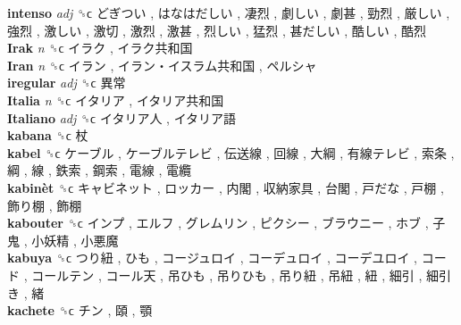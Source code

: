 \textbf{intenso} \emph{adj}  ␝ϲ   どぎつい ,  はなはだしい ,  凄烈 ,  劇しい ,  劇甚 ,  勁烈 ,  厳しい ,  強烈 ,  激しい ,  激切 ,  激烈 ,  激甚 ,  烈しい ,  猛烈 ,  甚だしい ,  酷しい ,  酷烈   \\
\textbf{Irak} \emph{n}  ␝ϲ   イラク ,  イラク共和国   \\
\textbf{Iran} \emph{n}  ␝ϲ   イラン ,  イラン・イスラム共和国 ,  ペルシャ   \\
\textbf{iregular} \emph{adj}  ␝ϲ   異常   \\
\textbf{Italia} \emph{n}  ␝ϲ   イタリア ,  イタリア共和国   \\
\textbf{Italiano} \emph{adj}  ␝ϲ   イタリア人 ,  イタリア語   \\
\textbf{kabana} ␝ϲ   杖   \\
\textbf{kabel} ␝ϲ   ケーブル ,  ケーブルテレビ ,  伝送線 ,  回線 ,  大綱 ,  有線テレビ ,  索条 ,  綱 ,  線 ,  鉄索 ,  鋼索 ,  電線 ,  電纜   \\
\textbf{kabinèt} ␝ϲ   キャビネット ,  ロッカー ,  内閣 ,  収納家具 ,  台閣 ,  戸だな ,  戸棚 ,  飾り棚 ,  飾棚   \\
\textbf{kabouter} ␝ϲ   インプ ,  エルフ ,  グレムリン ,  ピクシー ,  ブラウニー ,  ホブ ,  子鬼 ,  小妖精 ,  小悪魔   \\
\textbf{kabuya} ␝ϲ   つり紐 ,  ひも ,  コージュロイ ,  コーデュロイ ,  コーデユロイ ,  コード ,  コールテン ,  コール天 ,  吊ひも ,  吊りひも ,  吊り紐 ,  吊紐 ,  紐 ,  細引 ,  細引き ,  緒   \\
\textbf{kachete} ␝ϲ   チン ,  頤 ,  顎   \\
